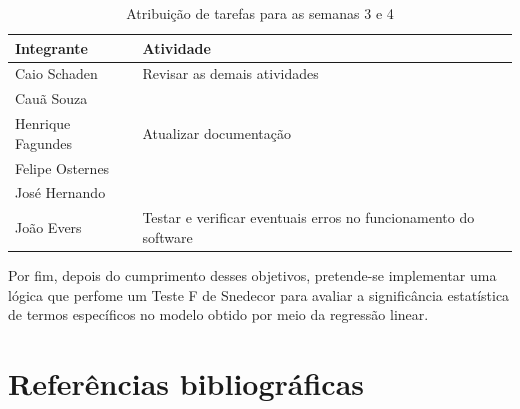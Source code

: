 \documentclass[12pt]{article}
\begin{document}
\begin{table}[H]
	\centering
	\caption{Atribuição de tarefas para as semanas 3 e 4}
	\begin{tabular}{l p{10cm}}
		\toprule
		\textbf{Integrante} & \textbf{Atividade}                                              \\
		\midrule
		Caio Schaden        & Revisar as demais atividades                                    \\
		Cauã Souza          &                                                                 \\
		\hline
		Henrique Fagundes   & Atualizar documentação                                          \\
		Felipe Osternes     &                                                                 \\
		\hline
		José Hernando       &                                                                 \\
		João Evers          & Testar e verificar eventuais erros no funcionamento do software \\
		\bottomrule
	\end{tabular}
	\label{tab:tarefas}
\end{table}

Por fim, depois do cumprimento desses objetivos, pretende-se implementar uma lógica que perfome um Teste F de Snedecor para avaliar a significância estatística de termos específicos no modelo obtido por meio da regressão linear.

\newpage

\section*{Referências bibliográficas}
\begingroup
\renewcommand{\section}[2]{}

\endgroup
\end{document}
